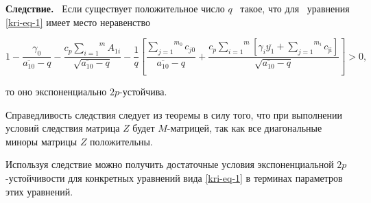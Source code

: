 \textbf{Следствие.} \ Если существует положительное число  $q$ \ такое, что для \ уравнения \eqref{kri-eq-1} имеет место
неравенство

\begin{equation}\label{kri-eq-14}
	1-\frac{\gamma _0}{\overline{a_{10}}-q}-\frac{c_p\overset m{\underset{i=1}{\sum
		}}A_{1i}}{\sqrt{\overline{a_{10}}-q}}-\frac 1 q\left[\frac{\overset{m_0}{\underset{j=1}{\sum
		}}c_{\mathit{j0}}}{\overline{a_{10}}-q}+\frac{c_p\overset m{\underset{i=1}{\sum }}\left[\gamma
		_i\overline{y_1}+\overset{m_i}{\underset{j=1}{\sum
		}}c_{\text{ji}}\right]}{\sqrt{\overline{a_{10}}-q}}\right]>0,
\end{equation}

то оно экспоненциально  $2p${}-устойчива.

Справедливость следствия следует из теоремы в силу того, что при выполнении условий следствия матрица  $Z$
будет  $M${}-матрицей, так как все диагональные миноры матрицы  $Z$
положительны.

Используя следствие можно получить достаточные условия экспоненциальной  $2p$-\linebreak устойчивости для конкретных уравнений
вида \eqref{kri-eq-1} в терминах параметров этих уравнений. 